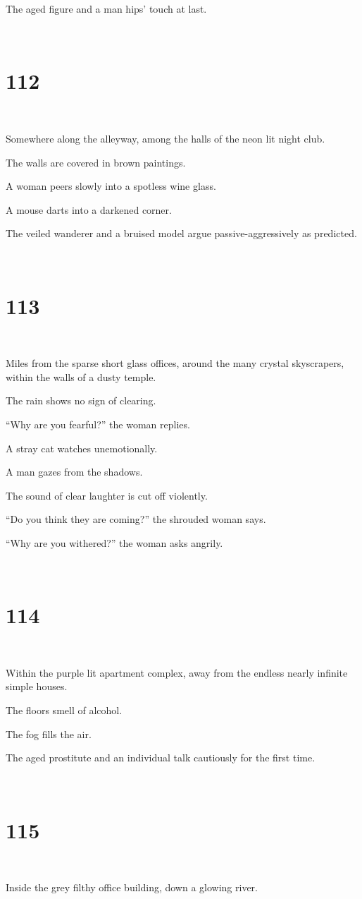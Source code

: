 \documentclass{report}
\begin{document}
The aged figure and a man hips' touch at last.

~
\chapter*{112}
~

Somewhere along the alleyway, among the halls of the neon lit night club.

The walls are covered in brown paintings.

A woman peers slowly into a spotless wine glass.

A mouse darts into a darkened corner.

The veiled wanderer and a bruised model argue passive-aggressively as predicted.

~
\chapter*{113}
~

Miles from the sparse short glass offices, around the many crystal skyscrapers, within the walls of a dusty temple.

The rain shows no sign of clearing.

``Why are you fearful?'' the woman replies.

A stray cat watches unemotionally.

A man gazes from the shadows.

The sound of clear laughter is cut off violently.

``Do you think they are coming?'' the shrouded woman says.

``Why are you withered?'' the woman asks angrily.

~
\chapter*{114}
~

Within the purple lit apartment complex, away from the endless nearly infinite simple houses.

The floors smell of alcohol.

The fog fills the air.

The aged prostitute and an individual talk cautiously for the first time.

~
\chapter*{115}
~

Inside the grey filthy office building, down a glowing river.
\end{document}
